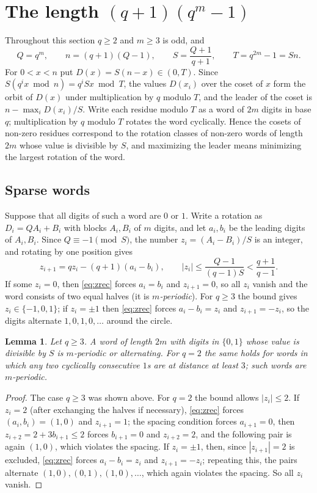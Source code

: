 \documentclass[11pt]{amsart}
\newtheorem{lemma}[theorem]{Lemma}
\theoremstyle{remark}
\begin{document}
\section{The length $(q+1)(q^m-1)$}\label{sec:minus}

Throughout this section $q\ge2$ and $m\ge3$ is odd, and
\[
Q=q^m,\qquad n=(q+1)(Q-1),\qquad S=\frac{Q+1}{q+1},\qquad T=q^{2m}-1=Sn .
\]
For $0<x<n$ put $D(x)=S(n-x)\in(0,T)$.
Since $S(q^ix\bmod n)=q^iSx\bmod T$, the values $D(x_i)$ over the coset of $x$ form the orbit of $D(x)$ under multiplication by $q$ modulo $T$, and the leader of the coset is $n-\max_i D(x_i)/S$.
Write each residue modulo $T$ as a word of $2m$ digits in base $q$; multiplication by $q$ modulo $T$ rotates the word cyclically.
Hence the cosets of non-zero residues correspond to the rotation classes of non-zero words of length $2m$ whose value is divisible by $S$, and maximizing the leader means minimizing the largest rotation of the word.

\subsection{Sparse words}

Suppose that all digits of such a word are $0$ or $1$.
Write a rotation as $D_i=QA_i+B_i$ with blocks $A_i,B_i$ of $m$ digits, and let $a_i,b_i$ be the leading digits of $A_i,B_i$.
Since $Q\equiv-1\pmod S$, the number $z_i=(A_i-B_i)/S$ is an integer, and rotating by one position gives
\begin{equation}\label{eq:zrec}
z_{i+1}=qz_i-(q+1)(a_i-b_i),\qquad |z_i|\le\frac{Q-1}{(q-1)S}<\frac{q+1}{q-1}.
\end{equation}
If some $z_i=0$, then \eqref{eq:zrec} forces $a_i=b_i$ and $z_{i+1}=0$, so all $z_i$ vanish and the word consists of two equal halves (it is \emph{$m$-periodic}).
For $q\ge3$ the bound gives $z_i\in\{-1,0,1\}$; if $z_i=\pm1$ then \eqref{eq:zrec} forces $a_i-b_i=z_i$ and $z_{i+1}=-z_i$, so the digits alternate $1,0,1,0,\dots$ around the circle.

\begin{lemma}\label{lem:sparse}
Let $q\ge3$.
A word of length $2m$ with digits in $\{0,1\}$ whose value is divisible by $S$ is $m$-periodic or alternating.
For $q=2$ the same holds for words in which any two cyclically consecutive $1$s are at distance at least $3$; such words are $m$-periodic.
\end{lemma}

\begin{proof}
The case $q\ge3$ was shown above.
For $q=2$ the bound allows $|z_i|\le2$.
If $z_i=2$ (after exchanging the halves if necessary), \eqref{eq:zrec} forces $(a_i,b_i)=(1,0)$ and $z_{i+1}=1$; the spacing condition forces $a_{i+1}=0$, then $z_{i+2}=2+3b_{i+1}\le2$ forces $b_{i+1}=0$ and $z_{i+2}=2$, and the following pair is again $(1,0)$, which violates the spacing.
If $z_i=\pm1$, then, since $|z_{i+1}|=2$ is excluded, \eqref{eq:zrec} forces $a_i-b_i=z_i$ and $z_{i+1}=-z_i$; repeating this, the pairs alternate $(1,0),(0,1),(1,0),\dots$, which again violates the spacing.
So all $z_i$ vanish.
\end{proof}
\end{document}
